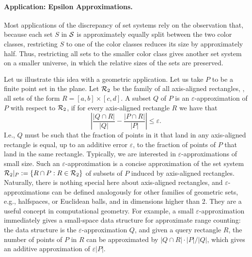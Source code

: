 \paragraph{Application: Epsilon Approximations.} 
Most applications of the discrepancy of set systems rely on the observation that, because each set $S$ in $\mathcal{S}$ is approximately equally split between the two color classes, restricting $S$ to one of the color classes reduces its size by approximately half. Thus, restricting all sets to the smaller color class gives another set system on a smaller universe, in which the relative sizes of the sets are preserved. 

Let us illustrate this idea with a geometric application. Let us take $P$ to be a finite point set in the plane. Let $\mathcal{R}_2$ be the family of all axis-aligned rectangles, \ie, all sets of the
form $R = [a,b]\times [c,d]$. A subset $Q$ of $P$ is an $\varepsilon$-approximation of $P$ with respect to $\mathcal{R}_2$, if for every axis-aligned rectangle $R$ we have that 
\[
\left|\frac{|Q \cap R|}{|Q|} - \frac{|P \cap R|}{|P|}\right| \le \varepsilon.
\]
I.e., $Q$ must be such that the fraction of points in it that land in any axis-aligned rectangle is equal, up to an additive error $\varepsilon$, to the fraction of points of $P$ that land in the same rectangle. Typically, we are interested in $\varepsilon$-approximations of small size. Such an $\varepsilon$-approximation is a concise approximation of the set system $\mathcal{R}_2|_P := \{R\cap P: R \in \mathcal{R}_2\}$ of subsets of $P$ induced by axis-aligned rectangles. Naturally, there is nothing special here about axis-aligned rectangles, and $\varepsilon$-approximations can be defined analogously for other families of geometric sets, e.g., halfspaces, or Euclidean balls, and in dimensions higher than 2. They are a useful concept in computational geometry. For example, a small $\varepsilon$-approximation immediately gives a small-space data structure for approximate range counting: the data structure is the $\varepsilon$-approximation $Q$, and given a query rectangle $R$, the number of points of $P$ in $R$ can be approximated by $|Q \cap R|\cdot |P|/|Q|$, which gives an additive approximation of $\varepsilon |P|$.




